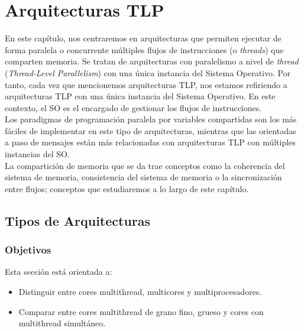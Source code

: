 \chapter{Arquitecturas TLP}
En este capítulo, nos centraremos en arquitecturas que permiten ejecutar de forma paralela o concurrente múltiples flujos de instrucciones (o \emph{threads}) que comparten memoria. Se tratan de arquitecturas con paralelismo a nivel de \emph{thread} (\emph{Thread-Level Parallelism}) con una única instancia del Sistema Operativo. Por tanto, cada vez que mencionemos arquitecturas TLP, nos estamos refiriendo a arquitecturas TLP con una única instancia del Sistema Operativo. En este contexto, el SO es el encargado de gestionar los flujos de instrucciones.\\

Los paradigmas de programación paralela por variables compartidas son los más fáciles de implementar en este tipo de arquitecturas, mientras que las orientadas a paso de mensajes están más relacionadas con arquitecturas TLP con múltiples instancias del SO\@.\\

La compartición de memoria que se da trae conceptos como la coherencia del sistema de memoria, consistencia del sistema de memoria o la sincronización entre flujos; conceptos que estudiaremos a lo largo de este capítulo.

\section{Tipos de Arquitecturas}
\subsection{Objetivos}
Esta sección está orientada a:
\begin{itemize}
    \item Distinguir entre cores multithread, multicores y multiprocesadores.
    \item Comparar entre cores multithread de grano fino, grueso y cores con multithread simultáneo.
\end{itemize}

